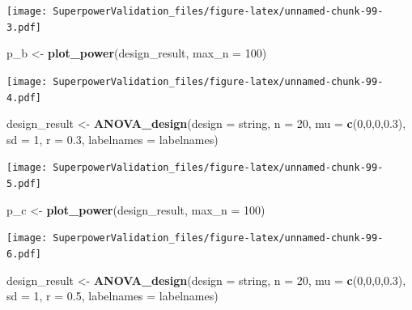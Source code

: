 \documentclass[]{book}
\newenvironment{Shaded}{\begin{snugshade}}{\end{snugshade}}
\newcommand{\DataTypeTok}[1]{\textcolor[rgb]{0.13,0.29,0.53}{#1}}
\newcommand{\DecValTok}[1]{\textcolor[rgb]{0.00,0.00,0.81}{#1}}
\newcommand{\FloatTok}[1]{\textcolor[rgb]{0.00,0.00,0.81}{#1}}
\newcommand{\KeywordTok}[1]{\textcolor[rgb]{0.13,0.29,0.53}{\textbf{#1}}}
\newcommand{\NormalTok}[1]{#1}
\newcommand{\StringTok}[1]{\textcolor[rgb]{0.31,0.60,0.02}{#1}}
\begin{document}
\texttt{[image: SuperpowerValidation\_files/figure-latex/unnamed-chunk-99-3.pdf]}

\begin{Shaded}
\begin{Highlighting}[]
\NormalTok{p_b <-}\StringTok{ }\KeywordTok{plot_power}\NormalTok{(design_result,}
                      \DataTypeTok{max_n =} \DecValTok{100}\NormalTok{)}
\end{Highlighting}
\end{Shaded}

\texttt{[image: SuperpowerValidation\_files/figure-latex/unnamed-chunk-99-4.pdf]}

\begin{Shaded}
\begin{Highlighting}[]
\NormalTok{design_result <-}\StringTok{ }\KeywordTok{ANOVA_design}\NormalTok{(}\DataTypeTok{design =}\NormalTok{ string,}
                              \DataTypeTok{n =} \DecValTok{20}\NormalTok{, }
                              \DataTypeTok{mu =} \KeywordTok{c}\NormalTok{(}\DecValTok{0}\NormalTok{,}\DecValTok{0}\NormalTok{,}\DecValTok{0}\NormalTok{,}\FloatTok{0.3}\NormalTok{), }
                              \DataTypeTok{sd =} \DecValTok{1}\NormalTok{, }
                              \DataTypeTok{r =} \FloatTok{0.3}\NormalTok{, }
                              \DataTypeTok{labelnames =}\NormalTok{ labelnames)}
\end{Highlighting}
\end{Shaded}

\texttt{[image: SuperpowerValidation\_files/figure-latex/unnamed-chunk-99-5.pdf]}

\begin{Shaded}
\begin{Highlighting}[]
\NormalTok{p_c <-}\StringTok{ }\KeywordTok{plot_power}\NormalTok{(design_result,}
                      \DataTypeTok{max_n =} \DecValTok{100}\NormalTok{)}
\end{Highlighting}
\end{Shaded}

\texttt{[image: SuperpowerValidation\_files/figure-latex/unnamed-chunk-99-6.pdf]}

\begin{Shaded}
\begin{Highlighting}[]
\NormalTok{design_result <-}\StringTok{ }\KeywordTok{ANOVA_design}\NormalTok{(}\DataTypeTok{design =}\NormalTok{ string,}
                              \DataTypeTok{n =} \DecValTok{20}\NormalTok{, }
                              \DataTypeTok{mu =} \KeywordTok{c}\NormalTok{(}\DecValTok{0}\NormalTok{,}\DecValTok{0}\NormalTok{,}\DecValTok{0}\NormalTok{,}\FloatTok{0.3}\NormalTok{), }
                              \DataTypeTok{sd =} \DecValTok{1}\NormalTok{, }
                              \DataTypeTok{r =} \FloatTok{0.5}\NormalTok{, }
                              \DataTypeTok{labelnames =}\NormalTok{ labelnames)}
\end{Highlighting}
\end{Shaded}
\end{document}
